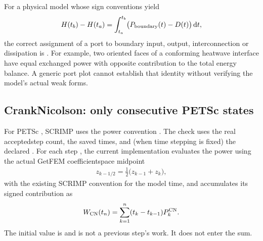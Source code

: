 \documentclass[letterpaper,10pt,english]{sphinxmanual}
\begin{document}
\sphinxAtStartPar
For a physical model whose sign conventions yield
\begin{equation*}
\begin{split}H(t_b)-H(t_a)
= \int_{t_a}^{t_b} \bigl(P_{\rm boundary}(t)
  -D(t)\bigr)\,\mathrm dt,\end{split}
\end{equation*}
\sphinxAtStartPar
the correct assignment of a port to boundary input, output, interconnection
or dissipation is . For example, two oriented faces of a
conforming heat\sphinxhyphen{}wave interface have equal exchanged power with opposite
contribution to the total energy balance. A generic port plot cannot
establish that identity without verifying the model’s actual weak forms.


\subsection{Crank\textendash{}Nicolson: only consecutive  PETSc states}
\label{\detokenize{energy_and_power:crank-nicolson-only-consecutive-accepted-petsc-states}}
\sphinxAtStartPar
For PETSc , SCRIMP uses the  power convention
.
The check uses the real accepted\sphinxhyphen{}step count, the saved times, and (when
time stepping is fixed) the declared . For each step ,
the current implementation evaluates the power using the actual
GetFEM coefficient\sphinxhyphen{}space midpoint
\begin{equation*}
\begin{split}z_{k-1/2}=\tfrac12\bigl(z_{k-1}+z_k\bigr),\end{split}
\end{equation*}
\sphinxAtStartPar
with the existing SCRIMP convention for the model time, and accumulates
its signed contribution as
\begin{equation*}
\begin{split}W_{\rm CN}(t_n)
= \sum_{k=1}^{n}(t_k-t_{k-1})P_k^{\rm CN}.\end{split}
\end{equation*}
\sphinxAtStartPar
The initial value  is  and is not a previous
step’s work. It does not enter the sum.
\end{document}
